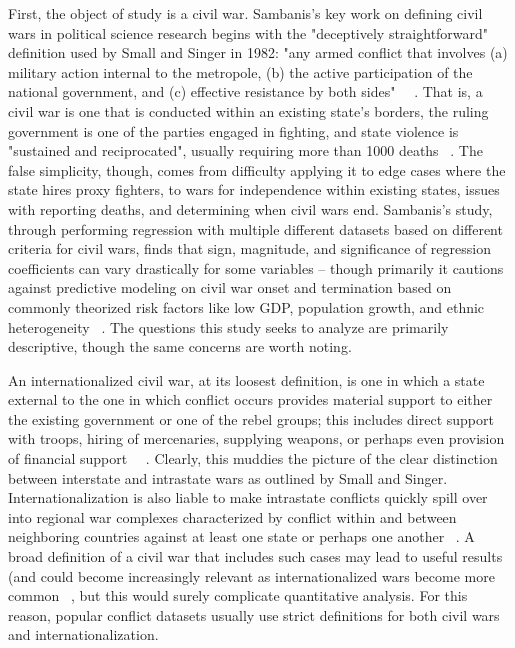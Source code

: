 \documentclass{article}
\begin{document}
First, the object of study is a civil war. Sambanis's key work on defining civil wars in political science research begins with the "deceptively straightforward" definition used by Small and Singer in 1982: "any armed conflict that involves (a) military action internal to the metropole, (b) the active participation of the national government, and (c) effective resistance by both sides" ~\cite{sambanis}~\cite{small-and-singer}. That is, a civil war is one that is conducted within an existing state's borders, the ruling government is one of the parties engaged in fighting, and state violence is "sustained and reciprocated", usually requiring more than 1000 deaths ~\cite{sambanis}. The false simplicity, though, comes from difficulty applying it to edge cases where the state hires proxy fighters, to wars for independence within existing states, issues with reporting deaths, and determining when civil wars end. Sambanis's study, through performing regression with multiple different datasets based on different criteria for civil wars, finds that sign, magnitude, and significance of regression coefficients can vary drastically for some variables -- though primarily it cautions against predictive modeling on civil war onset and termination based on commonly theorized risk factors like low GDP, population growth, and ethnic heterogeneity ~\cite{sambanis}. The questions this study seeks to analyze are primarily descriptive, though the same concerns are worth noting. 

An internationalized civil war, at its loosest definition, is one in which a state external to the one in which conflict occurs provides material support to either the existing government or one of the rebel groups; this includes direct support with troops, hiring of mercenaries, supplying weapons, or perhaps even provision of financial support ~\cite{bellamy}~\cite{kane}. Clearly, this muddies the picture of the clear distinction between interstate and intrastate wars as outlined by Small and Singer. Internationalization is also liable to make intrastate conflicts quickly spill over into regional war complexes characterized by conflict within and between neighboring countries against at least one state or perhaps one another ~\cite{gersovitz}. A broad definition of a civil war that includes such cases may lead to useful results (and could become increasingly relevant as internationalized wars become more common ~\cite{bellamy}, but this would surely complicate quantitative analysis. For this reason, popular conflict datasets usually use strict definitions for both civil wars and internationalization.
\end{document}
